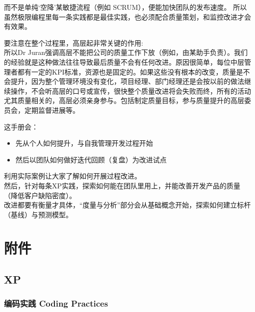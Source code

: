 而不是单纯`空降'某敏捷流程（例如 SCRUM），便能加快团队的发布速度。
所以虽然极限编程里每一条实践都是最佳实践，也必须配合质量策划，和监控改进才会有效果。


要注意在整个过程里，高层起非常关键的作用:\\
所以Dr
Juran强调高层不能把公司的质量工作下放（例如，由某助手负责）。我们的经验就是这种做法往往导致最后质量不会有任何改进。原因很简单，每位中层管理者都有一定的KPI标准，资源也是固定的。如果这些没有根本的改变，质量是不会提升，因为整个管理环境没有变化，项目经理、部门经理还是会按以前的做法继续操作，不会听高层的口号或宣传，很快整个质量改进将会失败而终，所有的活动尤其质量相关的，高层必须亲身参与。包括制定质量目标，参与质量提升的高层委员会，定期监督进展等。

这手册会：

\begin{itemize}
\tightlist
\item
  先从个人如何提升，与自我管理开发过程开始
\item
  然后以团队如何做好迭代回顾（复盘）为改进试点\\
\end{itemize}

利用实际案例让大家了解如何开展过程改进。\\
然后，针对每条XP实践，探索如何能在团队里用上，并能改善开发产品的质量（降低客户缺陷密度）。\\
改进都要有衡量才具体，``度量与分析''部分会从基础概念开始，探索如何建立标杆（基线）与预测模型。\\

\hypertarget{ux9644ux4ef6}{%
\section{附件}\label{ux9644ux4ef6}}

\hypertarget{xp}{%
\subsection{XP}\label{xp}}

\hypertarget{ux7f16ux7801ux5b9eux8df5-coding-practices}{%
\subsubsection{编码实践 Coding
Practices}\label{ux7f16ux7801ux5b9eux8df5-coding-practices}}

